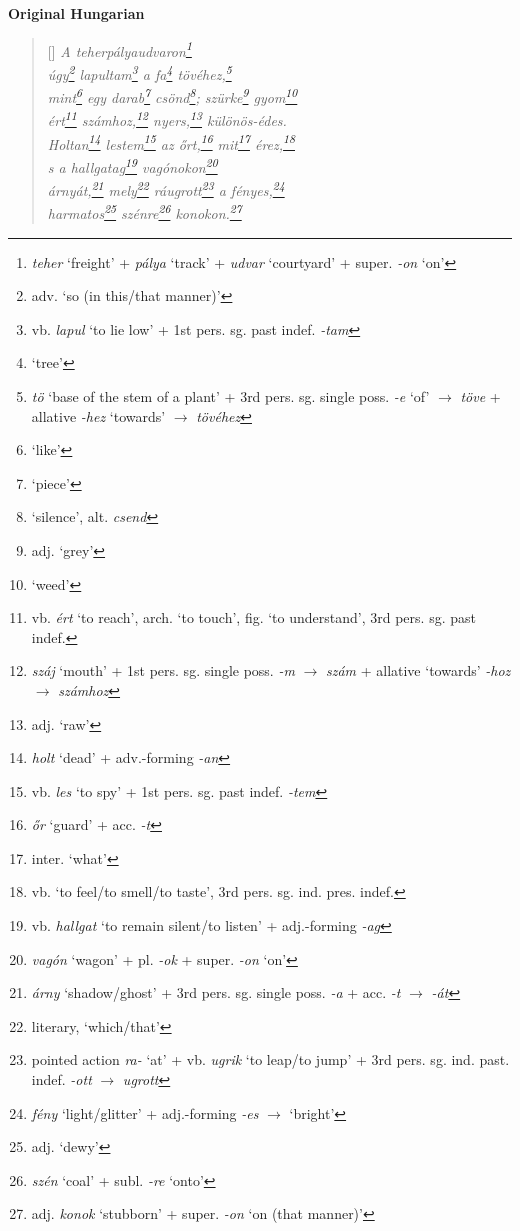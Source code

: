 \documentclass[a4paper,12pt,twoside,final]{book}
\begin{document}
\newpage


\noindent \textbf{Original Hungarian}



\settowidth{\versewidth}{Csak ami nincs, annak van bokra,}

\begin{verse}[\versewidth]
  \it
  A teherpályaudvaron\footnote{\emph{teher} `freight' + \emph{pálya}
  `track' + \emph{udvar} `courtyard' + super. \emph{-on} `on'} \\
  úgy\footnote{adv. `so (in this/that manner)'}
  lapultam\footnote{vb. \emph{lapul} `to lie low'
  + 1st pers. sg. past indef. \emph{-tam}} a
  fa\footnote{`tree'} tövéhez,\footnote{\emph{tö} `base of the stem
  of a plant' + 3rd pers. sg. single poss. \emph{-e} `of'
  $\rightarrow$ \emph{töve} + allative \emph{-hez} `towards'
  $\rightarrow$ \emph{tövéhez}} \\
  mint\footnote{`like'} egy darab\footnote{`piece'}
  csönd\footnote{`silence', alt. \emph{csend}};
  szürke\footnote{adj. `grey'} gyom\footnote{`weed'} \\
  ért\footnote{vb. \emph{ért} `to reach', arch. `to touch',
  fig. `to understand', 3rd pers. sg. past indef.}
  számhoz,\footnote{\emph{száj} `mouth' + 1st
  pers. sg. single poss. \emph{-m} $\rightarrow$ \emph{szám} +
  allative `towards' \emph{-hoz} $\rightarrow$ \emph{számhoz}}
  nyers,\footnote{adj. `raw'} különös-édes. \\
  Holtan\footnote{\emph{holt} `dead' + adv.-forming \emph{-an}}
  lestem\footnote{vb. \emph{les} `to spy' + 1st
  pers. sg. past indef. \emph{-tem}} az őrt,\footnote{\emph{őr} `guard' +
  acc. \emph{-t}} mit\footnote{inter. `what'}
  érez,\footnote{vb. `to feel/to smell/to taste',
  3rd pers. sg. ind. pres. indef.} \\
  s a hallgatag\footnote{vb. \emph{hallgat} `to remain silent/to
  listen' + adj.-forming \emph{-ag}} vagónokon\footnote{\emph{vagón}
  `wagon' + pl. \emph{-ok} + super. \emph{-on} `on'} \\
  árnyát,\footnote{\emph{árny} `shadow/ghost' + 3rd pers. sg. single
  poss. \emph{-a} + acc. \emph{-t} $\rightarrow$ \emph{-át}}
  mely\footnote{literary, `which/that'} ráugrott\footnote{pointed
  action \emph{ra-} `at' + vb. \emph{ugrik} `to leap/to jump' + 3rd
  pers. sg. ind. past. indef. \emph{-ott} $\rightarrow$ \emph{ugrott}} a
  fényes,\footnote{\emph{fény} `light/glitter' + adj.-forming \emph{-es}
  $\rightarrow$ `bright'} \\
  harmatos\footnote{adj. `dewy'} szénre\footnote{\emph{szén}
  `coal' + subl. \emph{-re} `onto'}
  konokon.\footnote{adj. \emph{konok} `stubborn' +
  super. \emph{-on} `on (that manner)'} \\
\end{verse}
\end{document}
